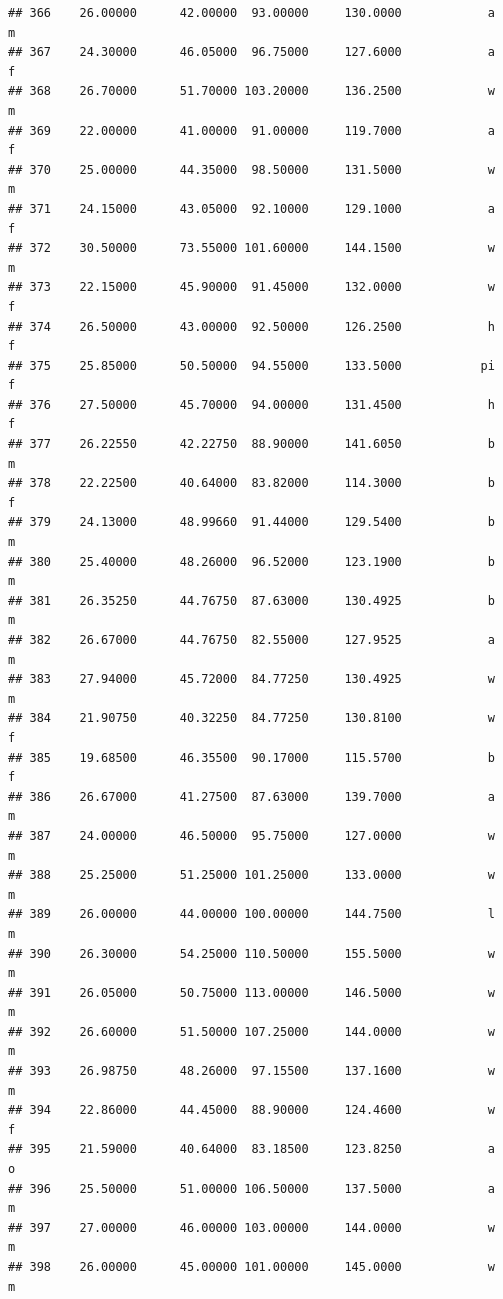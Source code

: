 \documentclass[]{article}
\begin{document}
\begin{verbatim}
## 366    26.00000      42.00000  93.00000     130.0000            a         m
## 367    24.30000      46.05000  96.75000     127.6000            a         f
## 368    26.70000      51.70000 103.20000     136.2500            w         m
## 369    22.00000      41.00000  91.00000     119.7000            a         f
## 370    25.00000      44.35000  98.50000     131.5000            w         m
## 371    24.15000      43.05000  92.10000     129.1000            a         f
## 372    30.50000      73.55000 101.60000     144.1500            w         m
## 373    22.15000      45.90000  91.45000     132.0000            w         f
## 374    26.50000      43.00000  92.50000     126.2500            h         f
## 375    25.85000      50.50000  94.55000     133.5000           pi         f
## 376    27.50000      45.70000  94.00000     131.4500            h         f
## 377    26.22550      42.22750  88.90000     141.6050            b         m
## 378    22.22500      40.64000  83.82000     114.3000            b         f
## 379    24.13000      48.99660  91.44000     129.5400            b         m
## 380    25.40000      48.26000  96.52000     123.1900            b         m
## 381    26.35250      44.76750  87.63000     130.4925            b         m
## 382    26.67000      44.76750  82.55000     127.9525            a         m
## 383    27.94000      45.72000  84.77250     130.4925            w         m
## 384    21.90750      40.32250  84.77250     130.8100            w         f
## 385    19.68500      46.35500  90.17000     115.5700            b         f
## 386    26.67000      41.27500  87.63000     139.7000            a         m
## 387    24.00000      46.50000  95.75000     127.0000            w         m
## 388    25.25000      51.25000 101.25000     133.0000            w         m
## 389    26.00000      44.00000 100.00000     144.7500            l         m
## 390    26.30000      54.25000 110.50000     155.5000            w         m
## 391    26.05000      50.75000 113.00000     146.5000            w         m
## 392    26.60000      51.50000 107.25000     144.0000            w         m
## 393    26.98750      48.26000  97.15500     137.1600            w         m
## 394    22.86000      44.45000  88.90000     124.4600            w         f
## 395    21.59000      40.64000  83.18500     123.8250            a         o
## 396    25.50000      51.00000 106.50000     137.5000            a         m
## 397    27.00000      46.00000 103.00000     144.0000            w         m
## 398    26.00000      45.00000 101.00000     145.0000            w         m

\end{verbatim}
\end{document}
